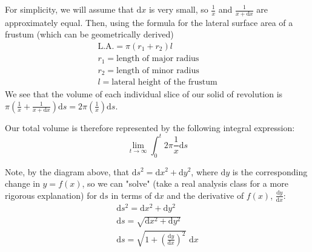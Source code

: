 \documentclass{article}[11pt]
\begin{document}
\begin{center}
\end{center}

For simplicity, we will assume that $\textrm{d}x$ is very small, so $\frac1x$ and $\frac1{x+\textrm{d}x}$ are approximately equal. Then, using the formula for the lateral surface area of a frustum (which can be geometrically derived)
\begin{gather*}
    \textrm{L.A.} = \pi(r_1 + r_2)l \\
    r_1 = \textrm{length of major radius} \\
    r_2 = \textrm{length of minor radius} \\
    l = \textrm{lateral height of the frustum}
\end{gather*}
We see that the volume of each individual slice of our solid of revolution is $\pi(\frac1x + \frac1{x+\textrm{d}x})\textrm{d}s = 2\pi(\frac1x)\textrm{d}s$.

Our total volume is therefore represented by the following integral expression:
$$\lim_{t \to \infty}\int_{0}^{t}2\pi\frac1x \textrm{d}s$$

Note, by the diagram above, that $\textrm{d}s^2 = \textrm{d}x^2 + \textrm{d}y^2$, where $\textrm{d}y$ is the corresponding change in $y=f(x)$, so we can "solve" (take a real analysis class for a more rigorous explanation) for $\textrm{d}s$ in terms of $\textrm{d}x$ and the derivative of $f(x)$, $\frac{\textrm{d}y}{\textrm{d}x}$:
\begin{gather*}
    \textrm{d}s^2 = \textrm{d}x^2 + \textrm{d}y^2 \\
    \textrm{d}s = \sqrt{\textrm{d}x^2 + \textrm{d}y^2} \\
    \textrm{d}s = \sqrt{1 + (\frac{\textrm{d}y}{\textrm{d}x})^2} \, \, \textrm{d}x
\end{gather*}
\end{document}
